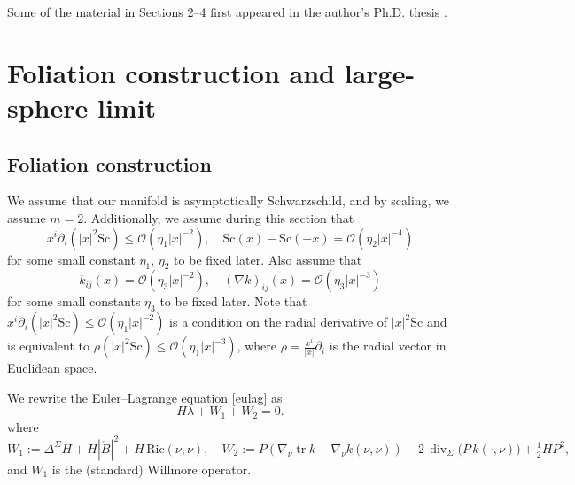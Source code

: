 \documentclass[12pt,a4paper]{amsart}
\theoremstyle{plain}
\theoremstyle{definition}
\newcommand{\tr}{\operatorname{tr}}
\begin{document}
\vspace{0.305 cm}
Some of the material in Sections 2–4 first appeared in the author’s Ph.D. thesis \cite{PenuelaThesis}.
\vspace{0.4 cm}  

















 \section{Foliation construction and large-sphere limit }\label{large foliations}

\subsection{Foliation construction}




We  assume that our manifold is asymptotically 
Schwarzschild, and by scaling, we  assume $m=2$. Additionally, we  assume during this section that
\begin{equation}
    x^i \partial_i (|x|^2 \mathrm{Sc} ) \leq \mathcal{O}(\eta_1 |x|^{-2}), \quad  \mathrm{Sc}(x)-\mathrm{Sc}(-x)= \mathcal{O}(\eta_2 |x|^{-4})
\end{equation}
for some small constant $ \eta_1$, $\eta_2$ to be fixed later. Also assume that  
\begin{equation}\label{assumpi}
k_{ij}(x) = \mathcal{O}(\eta_3 |x|^{-2}) , \quad (\nabla k)_{ij}(x)= \mathcal{O}(\eta_3 |x|^{-3}) 
\end{equation}
for some small constants $ \eta_3$ to be fixed later. Note that  $x^i \partial_i (|x|^2 \mathrm{Sc} ) \leq \mathcal{O}(\eta_1 |x|^{-2})$ is a condition on the radial derivative of $|x|^2 \mathrm{Sc}$ and is equivalent to $\rho (|x|^2 \mathrm{Sc} ) \leq \mathcal{O}(\eta_1 |x|^{-3})$, where $\rho=\frac{x^i}{|x|}\partial_i $ is the radial vector in Euclidean space.



We rewrite the Euler–Lagrange equation \eqref{eulag} as 
\begin{equation}\label{shorteug}
    H\lambda+ W_1 + W_2=0.
\end{equation}
where
\begin{equation}\label{explaineulag}
   W_1 := \Delta^\Sigma H + H|\mathring{B}|^2 + H\,\mathrm{Ric}(\nu,\nu),
\quad
W_2 := P(\nabla_\nu \tr k - \nabla_\nu k(\nu,\nu))
      - 2\,\operatorname{div}_\Sigma\!\big(P\,k(\cdot,\nu)\big)
      + \tfrac12 H P^2, 
\end{equation}
and $W_1$ is the (standard) Willmore operator.
\end{document}
